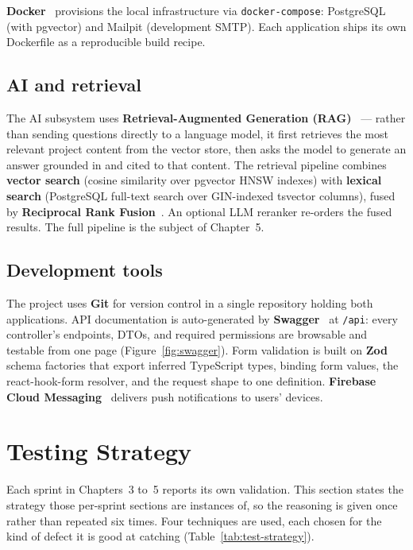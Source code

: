\textbf{Docker}~\cite{docker} provisions the local infrastructure via \texttt{docker-compose}:
PostgreSQL (with pgvector) and Mailpit (development SMTP). Each application ships its
own Dockerfile as a reproducible build recipe.

\subsection{AI and retrieval}

The AI subsystem uses \textbf{Retrieval-Augmented Generation
(RAG)}~\cite{lewis2020rag} --- rather than sending questions directly to a language model, it
first retrieves the most relevant project content from the vector store, then asks the model to
generate an answer grounded in and cited to that content. The retrieval pipeline combines
\textbf{vector search} (cosine similarity over pgvector HNSW indexes) with \textbf{lexical
search} (PostgreSQL full-text search over GIN-indexed tsvector columns), fused by
\textbf{Reciprocal Rank Fusion}~\cite{cormack2009rrf}. An optional LLM reranker re-orders the
fused results. The full pipeline is the subject of Chapter~5.

\subsection{Development tools}

The project uses \textbf{Git} for version control in a single repository holding both
applications. API documentation is auto-generated by \textbf{Swagger}~\cite{swagger} at
\texttt{/api}: every controller's endpoints, DTOs, and required permissions are browsable and
testable from one page (Figure~\ref{fig:swagger}). Form validation is built on
\textbf{Zod}~\cite{zod} schema factories that export
inferred TypeScript types, binding form values, the react-hook-form resolver, and the request
shape to one definition. \textbf{Firebase Cloud Messaging}~\cite{fcm} delivers push
notifications to users' devices.


\section{Testing Strategy}

Each sprint in Chapters~3 to~5 reports its own validation. This section states the strategy
those per-sprint sections are instances of, so the reasoning is given once rather than repeated
six times. Four techniques are used, each chosen for the kind of defect it is good at catching
(Table~\ref{tab:test-strategy}).

